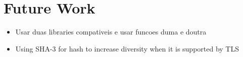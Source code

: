 \documentclass{sig-alternate-05-2015}
\begin{document}

\section{Future Work}

\begin{itemize}
\item Usar duas libraries compativeis e usar funcoes duma e doutra
\item Using SHA-3 for hash to increase diversity when it is supported by TLS
\end{itemize}

%

%
%
\end{document}
